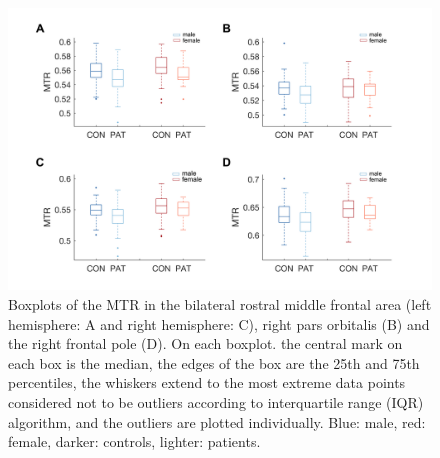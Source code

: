 \begin{refsection}
\begin{figure}[H]
\centering
  \includegraphics[width=\linewidth]{images/mtrFigS3.png}
  \caption{\small Boxplots of the MTR in the bilateral rostral middle frontal area (left hemisphere: A and right hemisphere: C), right pars orbitalis (B) and the right frontal pole (D). On each boxplot. the central mark on each box is the median, the edges of the box are the 25th and 75th percentiles, the whiskers extend to the most extreme data points considered not to be outliers according to interquartile range (IQR) algorithm, and the outliers are plotted individually. Blue: male, red: female, darker: controls, lighter: patients.}
  \label{mtrFigS3}
\end{figure}



\end{refsection}

